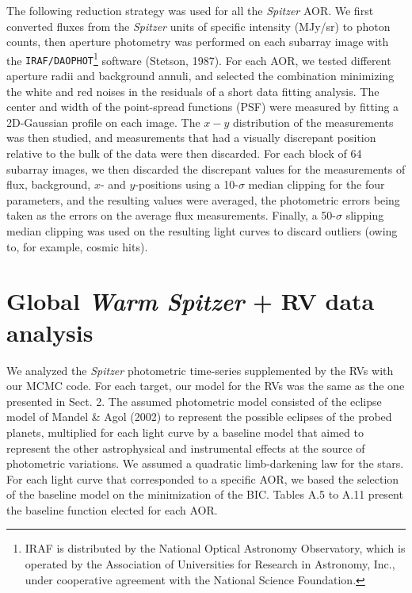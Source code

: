\documentclass[traditabstract]{aa}
\begin{document}
The following reduction strategy was used for all the {\it Spitzer} AOR. We first converted fluxes from the 
{\it Spitzer} units of specific intensity (MJy/sr) to photon counts, then aperture photometry was performed on
 each subarray image with the {\tt IRAF/DAOPHOT}\footnote{IRAF is distributed by the National Optical 
 Astronomy Observatory, which is operated by the Association of Universities for Research in Astronomy, Inc., 
 under cooperative agreement with the National Science Foundation.} software (Stetson, 1987). For each AOR, we 
 tested different aperture radii and background annuli, and selected the combination minimizing the 
white and red noises in the residuals of a short data fitting analysis. The center and width of the point-spread
 functions (PSF) were measured by fitting a 2D-Gaussian profile on each image. The $x-y$ distribution
of the measurements was then studied, and measurements that had a visually discrepant position relative to 
 the bulk of the data were then discarded. For each block of 64 subarray images, we then discarded the discrepant 
 values for the measurements of flux, background, $x$- and $y$-positions using a 10-$\sigma$ median clipping for 
 the four parameters, and the resulting values were averaged, the photometric errors being taken as the errors
on the average flux measurements. Finally, a 50-$\sigma$ slipping median clipping was used on the resulting 
 light curves to discard outliers (owing to, for example, cosmic hits). 
 
\section{Global {\it Warm Spitzer} + RV data analysis}

We analyzed the {\it Spitzer} photometric time-series supplemented by the RVs with our MCMC code. 
For each target, our model for the RVs was the same as the one presented in Sect. 2. The assumed photometric 
model consisted of the eclipse model of Mandel \& Agol (2002) to represent the possible eclipses of the probed 
planets, multiplied for each  light curve by a baseline model that aimed to represent the other astrophysical and instrumental 
effects at the source of photometric variations. We assumed a quadratic limb-darkening law for the stars. For each light curve 
that corresponded to a specific AOR, we based  the selection of the baseline model on the minimization of the BIC. Tables A.5 
to A.11 present the baseline function elected for each AOR.
\end{document}
